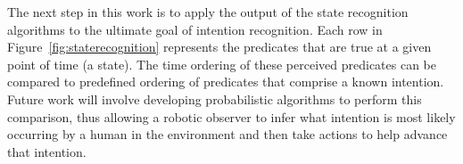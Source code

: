 \documentclass[preprint,12pt]{elsarticle}
\begin{document}
The next step in this work is to apply the output of the state recognition algorithms to the ultimate goal of intention recognition. Each row in Figure~\ref{fig:staterecognition}  represents the predicates that are true at a given point of time (a state). The time ordering of these perceived predicates can be compared to predefined ordering of predicates that comprise a known intention. Future work will involve developing probabilistic algorithms to perform this comparison, thus allowing a robotic observer to infer what intention is most likely occurring by a human in the environment and then take actions to help advance that intention.

%

%
%

\end{document}
